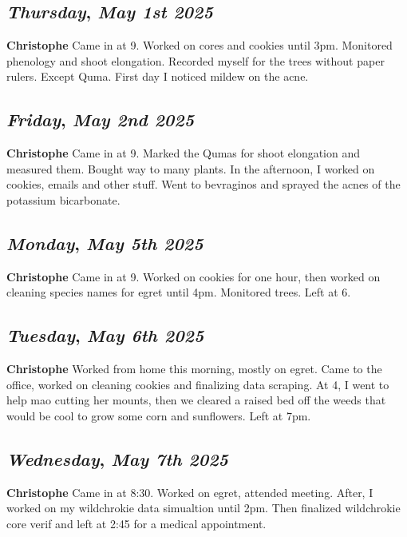 \begin{center}
\section*{\month}
\end{center}

\def\day{\textit{May 1st 2025}}
\def\weekday{\textit{Thursday}}
\subsection*{\weekday, \day}
\textbf {Christophe}
Came in at 9. Worked on cores and cookies until 3pm. Monitored phenology and shoot elongation. Recorded myself for the trees without paper rulers. Except Quma. First day I noticed mildew on the acne. 

\def\day{\textit{May 2nd 2025}}
\def\weekday{\textit{Friday}}
\subsection*{\weekday, \day}
\textbf {Christophe}
Came in at 9. Marked the Qumas for shoot elongation and measured them. Bought way to many plants. In the afternoon, I worked on cookies, emails and other stuff. Went to bevraginos and sprayed the acnes of the potassium bicarbonate. 

\def\day{\textit{May 5th 2025}}
\def\weekday{\textit{Monday}}
\subsection*{\weekday, \day}
\textbf {Christophe}
Came in at 9. Worked on cookies for one hour, then worked on cleaning species names for egret until 4pm. Monitored trees. Left at 6.

\def\day{\textit{May 6th 2025}}
\def\weekday{\textit{Tuesday}}
\subsection*{\weekday, \day}
\textbf {Christophe}
Worked from home this morning, mostly on egret. Came to the office, worked on cleaning cookies and finalizing data scraping. At 4, I went to help mao cutting her mounts, then we cleared a raised bed off the weeds that would be cool to grow some corn and sunflowers. Left at 7pm.

\def\day{\textit{May 7th 2025}}
\def\weekday{\textit{Wednesday}}
\subsection*{\weekday, \day}
\textbf {Christophe}
Came in at 8:30. Worked on egret, attended meeting. After, I worked on my wildchrokie data simualtion until 2pm. Then finalized wildchrokie core verif and left at 2:45 for a medical appointment. 

